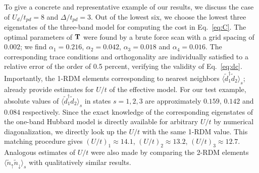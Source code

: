 To give a concrete and representative example of our results, we discuss the case of 
$U_d/t_{pd}=8$ and $\Delta/t_{pd}=3$. Out of the lowest six, we choose the lowest three eigenstates 
of the three-band model for computing the cost in Eq.~\ref{eq:C}. The 
optimal parameters of ${\bf T}$ were found by a brute force scan with a grid spacing of $0.002$; we find 
$\alpha_1=0.216$, $\alpha_2=0.042$, $\alpha_3=0.018$ and $\alpha_4=0.016$. 
The corresponding trace conditions and orthogonality are individually 
satisfied to a relative error of the order of 0.5 percent, verifying 
the validity of Eq.~\ref{eq:dc}. 
Importantly, the 1-RDM elements corresponding to nearest neighbors $\langle \tilde{d}_1^{\dagger} \tilde{d}_2 \rangle_s$; 
already provide estimates for $U/t$ of the effective model. 
For our test example, absolute values of $\langle \tilde{d}_1^{\dagger} \tilde{d}_2 \rangle_s$ 
in states $s=1,2,3$ are approximately $0.159$, $0.142$ and $0.084$ respectively. 
Since the exact knowledge of the corresponding eigenstates of the one-band Hubbard model is directly available for arbitrary 
$U/t$ by numerical diagonalization, we directly look up the $U/t$ with the same 1-RDM value.
This matching procedure gives $(U/t)_1 \approx 14.1 $, $(U/t)_2 \approx 13.2 $, $(U/t)_3 \approx 12.7 $. 
Analogous estimates of $U/t$ were also made by comparing the 2-RDM elements $\langle \tilde{n}_{\uparrow} \tilde{n}_{\downarrow} \rangle_s$ 
with qualitatively similar results. 


